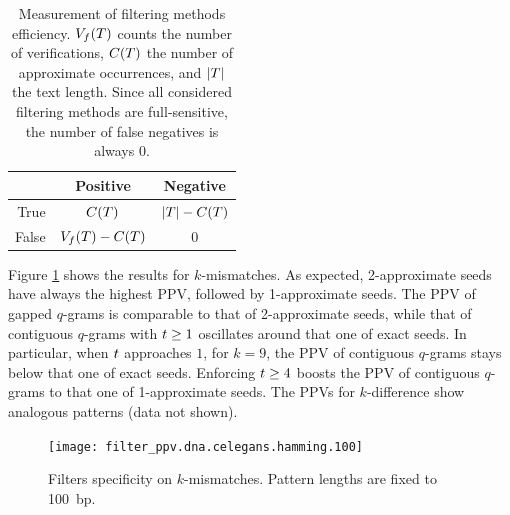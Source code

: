 \begin{table}[t]
\begin{center}
\caption[Measurement of filtering methods efficiency]{Measurement of filtering methods efficiency. $V_f(T)$ counts the number of verifications, $C(T)$ the number of approximate occurrences, and $|T|$ the text length. Since all considered filtering methods are full-sensitive, the number of false negatives is always 0.}
\begin{tabular}{rcc}
\toprule
  & Positive & Negative\\
\midrule
True & $C(T)$ & $|T| - C(T)$ \\
False & $V_f(T) - C(T)$ & 0		\\
\bottomrule
\end{tabular}
\label{tab:filter:ppv}
\end{center}
\end{table}

Figure \ref{fig:filter-ppv-hamming-celegans} shows the results for $k$-mismatches.
As expected, 2-approximate seeds have always the highest PPV, followed by 1-approximate seeds.
The PPV of gapped $q$-grams is comparable to that of 2-approximate seeds, while that of contiguous $q$-grams with $t \geq 1$ oscillates around that one of exact seeds.
In particular, when $t$ approaches $1$, \eg for $k = 9$, the PPV of contiguous $q$-grams stays below that one of exact seeds.
Enforcing $t \geq 4$ boosts the PPV of contiguous $q$-grams to that one of 1-approximate seeds.
The PPVs for $k$-difference show analogous patterns (data not shown).

\begin{figure}[b]
\begin{center}
\caption[Filters specificity on $k$-mismatches]{Filters specificity on $k$-mismatches. Pattern lengths are fixed to 100~bp.}
\label{fig:filter-ppv-hamming-celegans}
\texttt{[image: filter\_ppv.dna.celegans.hamming.100]}
\end{center}
\end{figure}

